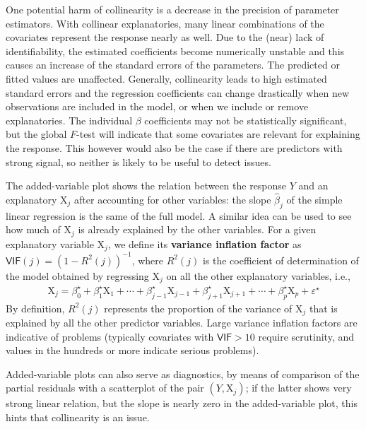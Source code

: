 \documentclass[
  11pt,
  letterpaper,
]{book}
\theoremstyle{definition}
\theoremstyle{definition}
\theoremstyle{definition}
\theoremstyle{definition}
\theoremstyle{remark}
\begin{document}
One potential harm of collinearity is a decrease in the precision of parameter estimators. With collinear explanatories, many linear combinations of the covariates represent the response nearly as well. Due to the (near) lack of identifiability, the estimated coefficients become numerically unstable and this causes an increase of the standard errors of the parameters. The predicted or fitted values are unaffected. Generally, collinearity leads to high estimated standard errors and the regression coefficients can change drastically when new observations are included in the model, or when we include or remove explanatories. The individual \(\beta\) coefficients may not be statistically significant, but the global \(F\)-test will indicate that some covariates are relevant for explaining the response. This however would also be the case if there are predictors with strong signal, so neither is likely to be useful to detect issues.

The added-variable plot shows the relation between the response \(Y\) and an explanatory \(\mathrm{X}_j\) after accounting for other variables: the slope \(\widehat{\beta}_j\) of the simple linear regression is the same of the full model. A similar idea can be used to see how much of \(\mathrm{X}_j\) is already explained by the other variables. For a given explanatory variable \(\mathrm{X}_j\), we define its \textbf{variance inflation factor} as \(\mathsf{VIF}(j)=(1-R^2(j))^{-1}\), where \(R^2(j)\) is the coefficient of determination of the model obtained by regressing \(\mathrm{X}_j\) on all the other explanatory variables, i.e.,
\begin{align*}
\mathrm{X}_j = \beta^{\star}_0 + \beta^{\star}_1 \mathrm{X}_1 + \cdots + \beta^{\star}_{j-1} \mathrm{X}_{j-1} + \beta^{\star}_{j+1} \mathrm{X}_{j+1} + \cdots + \beta^{\star}_p\mathrm{X}_p + \varepsilon^{\star}
\end{align*}
By definition, \(R^2(j)\) represents the proportion of the variance of \(\mathrm{X}_j\) that is explained by all the other predictor variables. Large variance inflation factors are indicative of problems (typically covariates with \(\mathsf{VIF}>10\) require scrutinity, and values in the hundreds or more indicate serious problems).

Added-variable plots can also serve as diagnostics, by means of comparison of the partial residuals with a scatterplot of the pair \((Y, \mathrm{X}_j)\); if the latter shows very strong linear relation, but the slope is nearly zero in the added-variable plot, this hints that collinearity is an issue.
\end{document}

